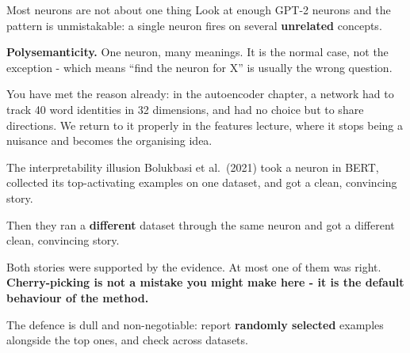 \documentclass[aspectratio=169]{beamer}
\newcommand{\keybox}[1]{%
  \begin{tcolorbox}[colback=armblue!8, colframe=armblue, boxrule=0.6pt, arc=2pt]
  #1
  \end{tcolorbox}}
\newcommand{\trapbox}[1]{%
  \begin{tcolorbox}[colback=armred!8, colframe=armred, boxrule=0.6pt, arc=2pt]
  #1
  \end{tcolorbox}}
\begin{document}
\begin{frame}{Most neurons are not about one thing}
  \vspace{0.6em}
  Look at enough GPT-2 neurons and the pattern is unmistakable: a single neuron fires on
  several \textbf{unrelated} concepts.

  \vspace{0.8em}
  \keybox{\textbf{Polysemanticity.} One neuron, many meanings. It is the normal case, not the
  exception - which means ``find the neuron for X'' is usually the wrong question.}

  \vspace{0.9em}
  You have met the reason already: in the autoencoder chapter, a network had to track 40 word
  identities in 32 dimensions, and had no choice but to share directions. We return to it
  properly in the features lecture, where it stops being a nuisance and becomes the organising
  idea.
\end{frame}

\begin{frame}{The interpretability illusion}
  \vspace{0.6em}
  Bolukbasi et al.\ (2021) took a neuron in BERT, collected its top-activating examples on one
  dataset, and got a clean, convincing story.

  \vspace{0.5em}
  Then they ran a \textbf{different} dataset through the same neuron and got a different clean,
  convincing story.

  \vspace{0.9em}
  \trapbox{Both stories were supported by the evidence. At most one of them was right.
  \textbf{Cherry-picking is not a mistake you might make here - it is the default behaviour of
  the method.}}

  \vspace{0.8em}
  The defence is dull and non-negotiable: report \textbf{randomly selected} examples alongside
  the top ones, and check across datasets.
\end{frame}
\end{document}
